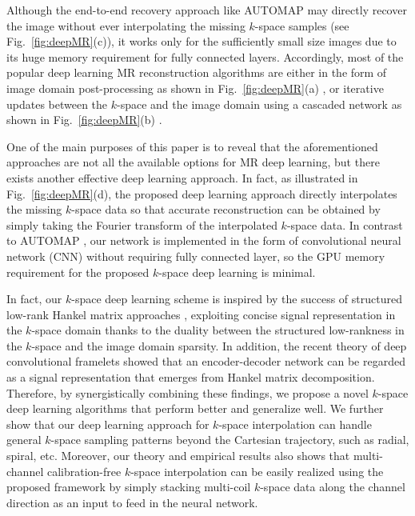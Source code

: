 \documentclass[10pt,journal]{IEEEtran}
\newcommand{\0}{{\boldsymbol{0}}}
\begin{document}
Although the  end-to-end recovery approach like AUTOMAP \cite{zhu2018image} may directly recover the image without ever interpolating the missing $k$-space samples (see Fig.~\ref{fig:deepMR}(c)),
it works only for the sufficiently small size images due to its huge memory requirement for fully connected layers.
Accordingly, most of the popular deep learning MR reconstruction algorithms
are either in the form of  image domain post-processing as shown in Fig.~\ref{fig:deepMR}(a) \cite{lee2018deep,han2017deep}, or iterative updates between the $k$-space and the image domain using a cascaded network as shown in Fig.~\ref{fig:deepMR}(b) \cite{hammernik2018learning,wang2016accelerating,schlemper2018deep,aggarwal2019modl}.



One of the main purposes of this paper is  to reveal that the aforementioned approaches are not all the available options for MR deep learning, but there exists 
another  effective
deep learning approach.
In fact, as illustrated in Fig.~\ref{fig:deepMR}(d),
the proposed deep learning approach directly interpolates the missing $k$-space data so that accurate reconstruction can be obtained by simply taking
the Fourier transform of the interpolated $k$-space data.
In contrast to AUTOMAP  \cite{zhu2018image},  our network is implemented in the form of convolutional neural network (CNN) 
without requiring fully connected layer, so the GPU memory requirement for the proposed
$k$-space deep learning is minimal.


In fact,  our $k$-space deep learning scheme is inspired by the success of structured low-rank Hankel matrix approaches \cite{shin2014calibrationless,haldar2014low,jin2016general,ongie2016off,ye2016compressive},
exploiting  concise signal representation in the $k$-space domain   thanks to the duality between
the structured low-rankness in the $k$-space  and the image domain sparsity.
In addition, the recent theory of deep convolutional framelets \cite{ye2017deep} showed that
an encoder-decoder network can be regarded as a signal representation that emerges from  Hankel matrix decomposition.
Therefore,  by synergistically combining these findings, we  propose
a novel  $k$-space deep learning algorithms that  perform better and generalize well.
We further show that our deep learning approach for
 $k$-space interpolation can handle general $k$-space sampling patterns beyond the Cartesian trajectory, such as radial, spiral, etc. 
Moreover, our theory and empirical results  also shows that
multi-channel calibration-free $k$-space interpolation can be easily realized using the
proposed framework by simply stacking multi-coil $k$-space data along the channel direction as an input to feed in the neural
network.
\end{document}
